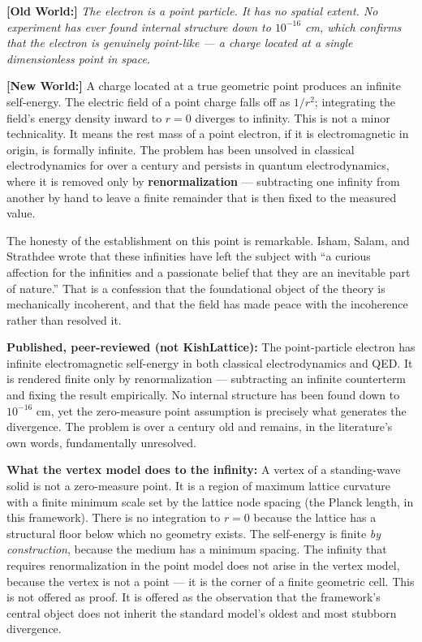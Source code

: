 \documentclass[11pt, letterpaper, openany]{book}
\newcommand{\oldworld}[1]{\noindent\textbf{\color{goldseal}[Old World:]}
  \textit{#1}\medskip}
\newcommand{\newworldcmd}[1]{\noindent\textbf{\color{kishblue}[New World:]}
  #1\medskip}
\begin{document}
\oldworld{The electron is a point particle. It has no spatial extent.
No experiment has ever found internal structure down to $10^{-16}$ cm,
which confirms that the electron is genuinely point-like --- a charge
located at a single dimensionless point in space.}
 
\newworldcmd{A charge located at a true geometric point produces an
infinite self-energy. The electric field of a point charge falls off as
$1/r^2$; integrating the field's energy density inward to $r = 0$ diverges
to infinity. This is not a minor technicality. It means the rest mass of
a point electron, if it is electromagnetic in origin, is formally infinite.
The problem has been unsolved in classical electrodynamics for over a
century and persists in quantum electrodynamics, where it is removed only
by \textbf{renormalization} --- subtracting one infinity from another by
hand to leave a finite remainder that is then fixed to the measured value.
 
The honesty of the establishment on this point is remarkable. Isham, Salam,
and Strathdee wrote that these infinities have left the subject with ``a
curious affection for the infinities and a passionate belief that they are
an inevitable part of nature.'' That is a confession that the foundational
object of the theory is mechanically incoherent, and that the field has
made peace with the incoherence rather than resolved it.}
 
\begin{empiricalbox}
\textbf{Published, peer-reviewed (not KishLattice):}
The point-particle electron has infinite electromagnetic self-energy in
both classical electrodynamics and QED. It is rendered finite only by
renormalization --- subtracting an infinite counterterm and fixing the
result empirically. No internal structure has been found down to
$10^{-16}$ cm, yet the zero-measure point assumption is precisely what
generates the divergence. The problem is over a century old and remains,
in the literature's own words, fundamentally unresolved.
\end{empiricalbox}
 
\begin{resolutionbox}
\textbf{What the vertex model does to the infinity:}
A vertex of a standing-wave solid is not a zero-measure point. It is a
region of maximum lattice curvature with a finite minimum scale set by
the lattice node spacing (the Planck length, in this framework). There
is no integration to $r = 0$ because the lattice has a structural floor
below which no geometry exists. The self-energy is finite \emph{by
construction}, because the medium has a minimum spacing. The infinity
that requires renormalization in the point model does not arise in the
vertex model, because the vertex is not a point --- it is the corner of
a finite geometric cell. This is not offered as proof. It is offered as
the observation that the framework's central object does not inherit the
standard model's oldest and most stubborn divergence.
\end{resolutionbox}
 
\end{document}
